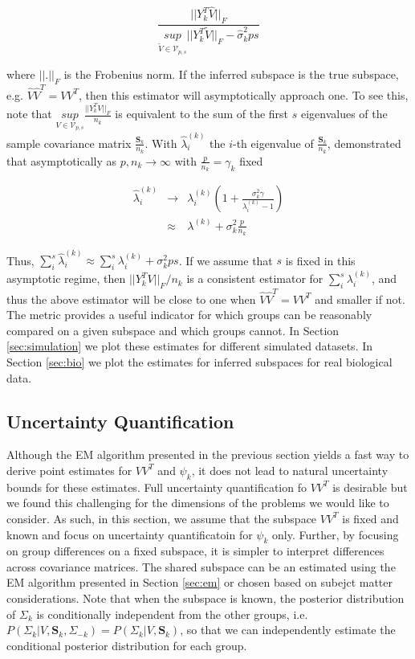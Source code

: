 \documentclass{article}
\newcommand{\bl}[1]{{\mathbf #1}}
\begin{document}
\begin{equation}
 \frac{||Y_k^T\hat{V}||_F}{\underset{\widetilde{V} \in \mathcal{V}_{p, s}}{sup}
  ||Y_k^T\widetilde{V}||_F - \hat{\sigma}_k^2ps}
\label{eqn:ratio}
\end{equation}

where $||.||_F$ is the Frobenius norm. If the inferred subspace is the
true subspace, e.g. $\hat{V}\hat{V}^T = VV^T$, then this estimator
will asymptotically approach one.  To see this, note that
$\underset{V \in \mathcal{V}_{p, s}}{sup}\frac{||Y_k^TV||_F}{n_k}$ is
equivalent to the sum of the first $s$ eigenvalues of the sample
covariance matrix $\frac{\bl S_k}{n_k}$.  With $\hat{\lambda}^{(k)}_i$
the $i$-th eigenvalue of $\frac{\bl S_k}{n_k}$, \citet{Baik2006}
demonstrated that asymptotically as $p, n_k \rightarrow \infty$ with
$\frac{p}{n_k} = \gamma_k$ fixed

\begin{eqnarray}
\hat{\lambda}^{(k)}_i &\rightarrow& \lambda^{(k)}_i\left(1 +
                                    \frac{\sigma_k^2\gamma}{\lambda^{(k)}_i
                                    - 1}\right)\\
& \approx& \lambda^{(k)} + \sigma^2_k\frac{p}{n_k}
\end{eqnarray}

Thus,
$\sum_i^s \hat{\lambda}^{(k)}_i \approx \sum_i^s \lambda^{(k)}_i +
\sigma_k^2ps$.
If we assume that $s$ is fixed in this asymptotic regime, then
$||Y_k^TV||_F/n_k$ is a consistent estimator for
$\sum_i^s \lambda^{(k)}_i$, and thus the above estimator will be close
to one when $\hat{V}\hat{V}^T = VV^T$ and smaller if not.  The metric provides a
useful indicator for which groups can be reasonably compared on a
given subspace and which groups cannot.  In Section \ref{sec:simulation} we plot
these estimates for different simulated datasets.  In Section \ref{sec:bio}
we plot the estimates for inferred subspaces for real biological data.

\subsection{Uncertainty Quantification}
\label{sec:bayes}

Although the EM algorithm presented in the previous section yields a
fast way to derive point estimates for $VV^T$ and $\psi_k$, it does
not lead to natural uncertainty bounds for these estimates. Full
uncertainty quantification fo $VV^T$ is desirable but we found this
challenging for the dimensions of the problems we would like to
consider.  As such, in this section, we assume that the subspace
$VV^T$ is fixed and known and focus on uncertainty quantificatoin for
$\psi_k$ only.  Further, by focusing on group differences on a fixed
subspace, it is simpler to interpret differences across covariance
matrices.  The shared subspace can be an estimated using the EM algorithm
presented in Section \ref{sec:em} or chosen based on subejct matter
considerations.  Note that when the subspace is known, the posterior
distribution of $\Sigma_k$ is conditionally independent from the other
groups, i.e.
$P(\Sigma_{k} | V, \bl S_k, \Sigma_{-k}) = P(\Sigma_{k} | V, \bl
S_k)$,
so that we can independently estimate the conditional posterior
distribution for each group.
\end{document}
